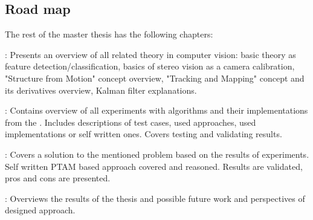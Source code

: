 \documentclass[../main]{subfiles}
\begin{document}
\subsection{Road map}

The rest of the master thesis has the following chapters: 

: Presents an overview of all related theory in computer vision: basic theory as feature detection/classification, basics of stereo vision as a camera calibration, "Structure from Motion" concept overview, "Tracking and Mapping" concept and its derivatives overview, Kalman filter explanations.

: Contains overview of all experiments with algorithms and their implementations from the . Includes descriptions of test cases, used approaches, used implementations or self written ones. Covers testing and validating results.

: Covers a solution to the mentioned problem based on the results of experiments. Self written PTAM based approach covered and reasoned. Results are validated, pros and cons are presented.

: Overviews the results of the thesis and possible future work and perspectives of designed approach.
\end{document}
